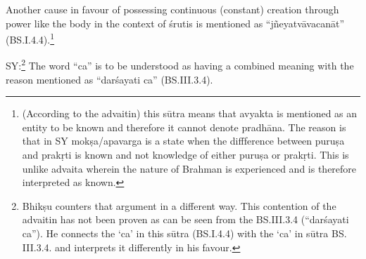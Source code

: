 \newpage

Another cause in favour of possessing continuous (constant) creation through power like the body in the context of śrutis is mentioned as “jñeyatvāvacanāt” (BS.I.4.4).\footnote{(According to the advaitin) this sūtra means that avyakta is mentioned as an entity to be known and therefore it cannot denote pradhāna. The reason is that in SY mokṣa/apavarga is a state when the diffference between puruṣa and prakṛti is known and not knowledge of either puruṣa or prakṛti. This is unlike advaita wherein the nature of Brahman is experienced and is therefore interpreted as known.}

\textbf{}



SY:\footnote{Bhikṣu counters that argument in a different way. This contention of the advaitin has not been  proven as can be seen from the BS.III.3.4 (“darśayati ca”). He connects the ‘ca’ in this sūtra (BS.I.4.4) with the ‘ca’ in sūtra BS. III.3.4. and interprets it differently in his favour. }  The word “ca” is to be understood as having a combined meaning with the reason mentioned as “darśayati ca” (BS.III.3.4). 


